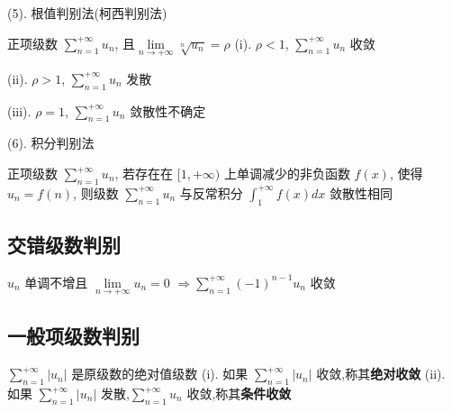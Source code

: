 (5). 根值判别法(柯西判别法)

\begin{theorem}[根值判别法]
	正项级数 $\sum\limits_{n=1}^{+\infty}u_{n}$, 且$\lim\limits_{n\rightarrow+\infty}\sqrt[n]{u_{n}}=\rho$
	(i). $\rho<1$, $\sum\limits_{n=1}^{+\infty}u_{n}$ 收敛

	(ii). $\rho>1$, $\sum\limits_{n=1}^{+\infty}u_{n}$ 发散

	(iii). $\rho=1$, $\sum\limits_{n=1}^{+\infty}u_{n}$ 敛散性不确定
\end{theorem}

(6). 积分判别法

\begin{theorem}[积分判别法]
	正项级数 $\sum\limits_{n=1}^{+\infty}u_{n}$, 若存在在 $[1,+\infty)$ 上单调减少的非负函数 $f(x)$, 
	使得 $u_{n} = f(n)$, 则级数 $\sum\limits_{n=1}^{+\infty}u_{n}$ 与反常积分 $\int_{1}^{+\infty}f(x)dx$ 敛散性相同

\end{theorem}
\subsection{交错级数判别}

\begin{theorem}[莱布尼茨判别法]
	$u_{n}$ 单调不增且 $\lim\limits_{n\rightarrow +\infty}u_{n}=0$  $\Rightarrow\sum\limits_{n=1}^{+\infty}(-1)^{n-1}u_{n}$ 收敛
\end{theorem}

\subsection{一般项级数判别}
\begin{definition}
	$\sum\limits_{n=1}^{+\infty}|u_{n}|$ 是原级数的绝对值级数
	(i). 如果 $\sum\limits_{n=1}^{+\infty}|u_{n}|$ 收敛,称其\textbf{绝对收敛}
	(ii). 如果 $\sum\limits_{n=1}^{+\infty}|u_{n}|$ 发散,$\sum\limits_{n=1}^{+\infty}u_{n}$ 收敛,称其\textbf{条件收敛}
\end{definition}
